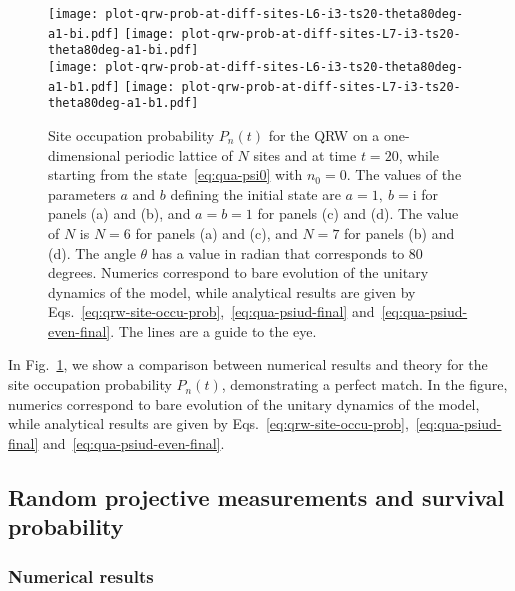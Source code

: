 \documentclass[12pt]{iopart}
\newcommand{\ii}{\mathrm{i}}
\begin{document}
\begin{figure}[!htbp]
\centering
\texttt{[image: plot-qrw-prob-at-diff-sites-L6-i3-ts20-theta80deg-a1-bi.pdf]}\hskip20pt
\texttt{[image: plot-qrw-prob-at-diff-sites-L7-i3-ts20-theta80deg-a1-bi.pdf]}\\[0.1ex]
\texttt{[image: plot-qrw-prob-at-diff-sites-L6-i3-ts20-theta80deg-a1-b1.pdf]}\hskip20pt
\texttt{[image: plot-qrw-prob-at-diff-sites-L7-i3-ts20-theta80deg-a1-b1.pdf]}
        \caption{Site occupation probability $P_n(t)$ for the QRW on
a one-dimensional periodic lattice of $N$ sites and at time $t=20$, while starting
from the state~\eqref{eq:qua-psi0} with $n_0=0$. The values of the
        parameters $a$ and $b$ defining the initial state are
        $a=1,~b=\ii$ for panels (a) and (b), and $a=b=1$ for panels (c)
        and (d). The value of $N$ is $N=6$ for panels (a) and (c), and
        $N=7$ for panels (b) and (d). The angle $\theta$ has a
        value in radian that corresponds to $80$ degrees. Numerics
correspond to bare evolution of the unitary dynamics of the model, while
analytical results are given by Eqs.~\eqref{eq:qrw-site-occu-prob},~\eqref{eq:qua-psiud-final}
and~\eqref{eq:qua-psiud-even-final}. The lines are a guide to the eye.}
\label{fig:qua-qrw-site-probability}
\end{figure}

In Fig.~\ref{fig:qua-qrw-site-probability}, we show a comparison between
numerical results and theory for the site occupation probability $P_n(t)$, demonstrating a perfect match.
In the figure, numerics
correspond to bare evolution of the unitary dynamics of the model, while
analytical results are given by Eqs.~\eqref{eq:qrw-site-occu-prob},~\eqref{eq:qua-psiud-final}
and~\eqref{eq:qua-psiud-even-final}. 

\subsection{Random projective measurements and survival probability}
\label{sec:QRW3}

\subsubsection{Numerical results}
\label{sec:QRW3a}
\end{document}
